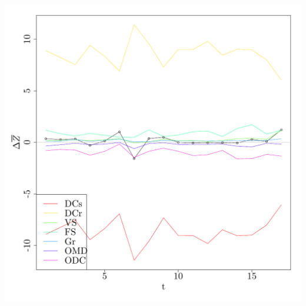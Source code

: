 \documentclass{article}\usepackage[]{graphicx}\usepackage[]{color}
\makeatletter
\def\maxwidth{ %
  \ifdim\Gin@nat@width>\linewidth
    \linewidth
  \else
    \Gin@nat@width
  \fi
}
\newenvironment{knitrout}{}{} %
\makeatother
\begin{document}
\begin{knitrout}
\includegraphics[width=\maxwidth]{figure/moredec} 

\end{knitrout}
\end{document}
